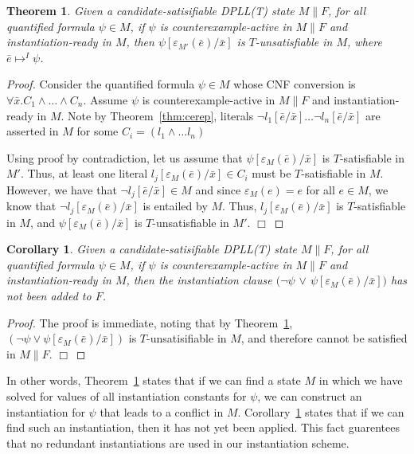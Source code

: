 \documentclass{llncs}
\newtheorem{thm}{Theorem}
\newtheorem{cor}{Corollary}
\begin{document}
\begin{thm}
\label{thm:instready}
Given a candidate-satisifiable DPLL(T) state $M \parallel F$, for all quantified formula $\psi \in M$, if $\psi$ is counterexample-active in $M \parallel F$ and instantiation-ready in $M$, then $\psi[\varepsilon_{M'}( \bar{e} )/\bar{x}]$ is $T$-unsatisfiable in $M$, where $\bar{e} \mapsto^I \psi$.
\end{thm}
\begin{proof}
Consider the quantified formula $\psi \in M$ whose CNF conversion is $\forall \bar{x}. C_1 \wedge \ldots \wedge C_n$.
Assume $\psi$ is counterexample-active in $M \parallel F$ and instantiation-ready in $M$.
Note by Theorem~\ref{thm:cerep}, literals $\neg l_1 [\bar{e}/\bar{x}] \ldots \neg l_n [ \bar{e}/\bar{x} ]$ are asserted in $M$ for some $C_i = ( l_1 \wedge \ldots l_n )$

Using proof by contradiction, let us assume that $\psi[\varepsilon_{M}( \bar{e} )/\bar{x}]$ is $T$-satisfiable in $M'$.
Thus, at least one literal $l_j[ \varepsilon_{M}( \bar{e} )/\bar{x}] \in C_i$ must be $T$-satisfiable in $M$.
However, we have that $\neg l_j [\bar{e}/\bar{x}] \in M$ and since $\varepsilon_{M}( e ) = e$ for all $e \in M$, we know that $\neg l_j [\varepsilon_{M}( \bar{e} )/\bar{x}]$ is entailed by $M$.
Thus, $l_j[ \varepsilon_{M}( \bar{e} )/\bar{x}]$ is $T$-satisfiable in $M$, and $\psi[\varepsilon_{M}( \bar{e} )/\bar{x}]$ is $T$-unsatisfiable in $M'$. $\Box$
\end{proof}

\begin{cor}
\label{cor:instready}
Given a candidate-satisifiable DPLL(T) state $M \parallel F$, for all quantified formula $\psi \in M$,
if $\psi$ is counterexample-active in $M \parallel F$ and instantiation-ready in $M$, then the instantiation clause $( \neg \psi$ $\vee$ $\psi[\varepsilon_{M}( \bar{e} )/\bar{x}])$ has not been added to $F$.
\end{cor}
\begin{proof}
The proof is immediate, noting that by Theorem~\ref{thm:instready}, $( \neg \psi \vee \psi[\varepsilon_{M}( \bar{e} )/\bar{x}])$ is $T$-unsatisifiable in $M$, and therefore cannot be satisfied in $M \parallel F$. $\Box$
\end{proof}

In other words, Theorem~\ref{thm:instready} states that if we can find a state $M$ in which we have solved for values of all instantiation constants for $\psi$, we can construct an instantiation for $\psi$ that leads to a conflict in $M$.
Corollary~\ref{cor:instready} states that if we can find such an instantiation, then it has not yet been applied.
This fact guarentees that no redundant instantiations are used in our instantiation scheme.
\end{document}

